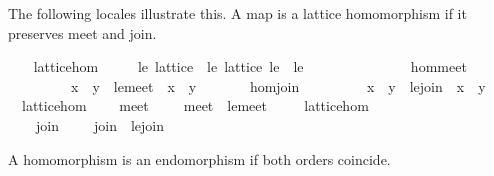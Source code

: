 \begin{isabellebody}
\begin{isamarkuptext}
  The following locales illustrate this.  A map \isa{{\isasymphi}} is a
  lattice homomorphism if it preserves meet and join.%
\end{isamarkuptext}%
\isamarkuptrue%
\ \ \isamarkupfalse%
\ lattice{\isacharunderscore}hom\ {\isacharequal}\isanewline
\ \ \ \ le{\isacharcolon}\ lattice\ {\isacharplus}\ le{\isacharprime}{\isacharcolon}\ lattice\ le{\isacharprime}\ \ le{\isacharprime}\ {\isacharparenleft}\ {\isachardoublequoteopen}{\isasympreceq}{\isachardoublequoteclose}\ {}{}{\isacharparenright}\ {\isacharplus}\isanewline
\ \ \ \ \ {\isasymphi}\isanewline
\ \ \ \ \ hom{\isacharunderscore}meet{\isacharcolon}\isanewline
\ \ \ \ \ \ \ \ {\isachardoublequoteopen}{\isasymphi}\ {\isacharparenleft}x\ {\isasymsqinter}\ y{\isacharparenright}\ {\isacharequal}\ le{\isacharprime}{\isachardot}meet\ {\isacharparenleft}{\isasymphi}\ x{\isacharparenright}\ {\isacharparenleft}{\isasymphi}\ y{\isacharparenright}{\isachardoublequoteclose}\isanewline
\ \ \ \ \ \ \ hom{\isacharunderscore}join{\isacharcolon}\isanewline
\ \ \ \ \ \ \ \ {\isachardoublequoteopen}{\isasymphi}\ {\isacharparenleft}x\ {\isasymsqunion}\ y{\isacharparenright}\ {\isacharequal}\ le{\isacharprime}{\isachardot}join\ {\isacharparenleft}{\isasymphi}\ x{\isacharparenright}\ {\isacharparenleft}{\isasymphi}\ y{\isacharparenright}{\isachardoublequoteclose}\isanewline
\isanewline
\ \ \isamarkupfalse%
\ {\isacharparenleft}\ lattice{\isacharunderscore}hom{\isacharparenright}\isanewline
\ \ \ \ meet{\isacharprime}\ {\isacharparenleft}\ {\isachardoublequoteopen}{\isasymsqinter}{\isacharprime}{\isacharprime}{\isachardoublequoteclose}\ {}{}{\isacharparenright}\ \ {\isachardoublequoteopen}meet{\isacharprime}\ {\isasymequiv}\ le{\isacharprime}{\isachardot}meet{\isachardoublequoteclose}\isanewline
\ \ \isamarkupfalse%
\ {\isacharparenleft}\ lattice{\isacharunderscore}hom{\isacharparenright}\isanewline
\ \ \ \ join{\isacharprime}\ {\isacharparenleft}\ {\isachardoublequoteopen}{\isasymsqunion}{\isacharprime}{\isacharprime}{\isachardoublequoteclose}\ {}{}{\isacharparenright}\ \ {\isachardoublequoteopen}join{\isacharprime}\ {\isasymequiv}\ le{\isacharprime}{\isachardot}join{\isachardoublequoteclose}%
\begin{isamarkuptext}%
A homomorphism is an endomorphism if both orders coincide.%

\end{isamarkuptext}
\end{isabellebody}
